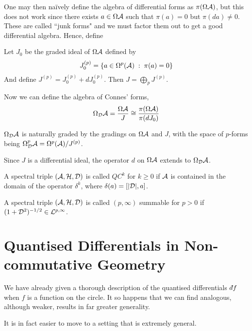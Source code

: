One may then na\"ively define the algebra of differential forms as $\pi(\Omega \mathcal{A})$,
but this does not work since there exists $a \in \Omega \mathcal{A}$ such that $\pi(a) = 0$
but $\pi(da) \neq 0$. These are called ``junk forms" and we must factor them out to get
a good differential algebra. Hence, define
\begin{definition}
    Let $J_0$ be the graded ideal of $\Omega \mathcal{A}$ defined by 
    \begin{equation*}
        J_0^{(p)} = \{a \in \Omega^p(\mathcal{A}) \;:\; \pi(a) = 0\}
    \end{equation*}
    And define $J^{(p)} = J_0^{(p)} + dJ_0^{(p)}$. Then $J = \bigoplus_p J^{(p)}$.


Now we can define the algebra of Connes' forms,
\begin{equation*}
    \Omega_{\mathcal{D}}\mathcal{A} = \frac{\Omega \mathcal{A}}{J} \cong \frac{\pi(\Omega \mathcal{A})}{\pi(dJ_0)}
\end{equation*}

$\Omega_{\mathcal{D}} \mathcal{A}$ is naturally graded by the gradings on $\Omega \mathcal{A}$ and $J$, with the 
space of $p$-forms being $\Omega^p_{\mathcal{D}} \mathcal{A} = \Omega^p(\mathcal{A})/J^{(p)}$.

Since $J$ is a differential ideal, the operator $d$ on $\Omega \mathcal{A}$
extends to $\Omega_{\mathcal{D}} \mathcal{A}$.  
\end{definition}

\begin{definition}
    A spectral triple $(\mathcal{A},\mathcal{H},\mathcal{D})$ is called $QC^k$ for $k \geq 0$
    if $\mathcal{A}$ is contained in the domain of the operator $\delta^k$, where $\delta(a) = [|\mathcal{D}|,a]$.
\end{definition}

\begin{definition}[Summability]
    A spectral triple $(\mathcal{A},\mathcal{H},\mathcal{D})$ is called $(p,\infty)$ summable
    for $p > 0$ if $(1+\mathcal{D}^2)^{-1/2} \in \mathcal{L}^{p,\infty}$.
\end{definition}

        
\section{Quantised Differentials in Non-commutative Geometry}
We have already given a thorough description of the quantised differentials $\qd f$
when $f$ is a function on the circle. It so happens that we can find
analogous, although weaker, results in far greater generality.

It is in fact easier to move to a setting that is extremely general.

